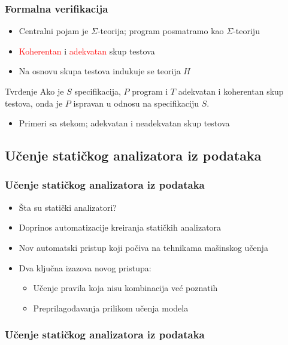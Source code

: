 \documentclass[11pt]{beamer}
\theoremstyle{definition}
\begin{document}
{\begin{frame}
\frametitle{Formalna verifikacija}
\begin{itemize}
\item Centralni pojam je $\Sigma$-teorija; program posmatramo kao $\Sigma$-teoriju
\item \textcolor{red}{Koherentan} i \textcolor{red}{adekvatan} skup testova
\item Na osnovu skupa testova indukuje se teorija $H$
\end{itemize}

\begin{block}{Tvrđenje}
Ako je $S$ specifikacija, $P$ program i $T$ adekvatan i koherentan skup testova, onda je $P$ ispravan u odnosu na specifikaciju $S$.
\end{block}

\begin{itemize}
\item Primeri sa stekom; adekvatan i neadekvatan skup testova
\end{itemize}
\end{frame}

\subsection{Učenje statičkog analizatora iz podataka}
\label{subsec:staticki-analizator}
\begin{frame}
\frametitle{Učenje statičkog analizatora iz podataka}

\begin{itemize}
	\item Šta su statički analizatori?
	\item Doprinos automatizacije kreiranja statičkih analizatora
	\item Nov automatski pristup koji počiva na tehnikama mašinskog učenja
	\item Dva ključna izazova novog pristupa:
	\begin{itemize}
		\item Učenje pravila koja nisu kombinacija već poznatih
		\item Preprilagođavanja prilikom učenja modela
	\end{itemize}
	
\end{itemize}

\end{frame}

\begin{frame}
\frametitle{Učenje statičkog analizatora iz podataka}


\end{frame}}
\end{document}

